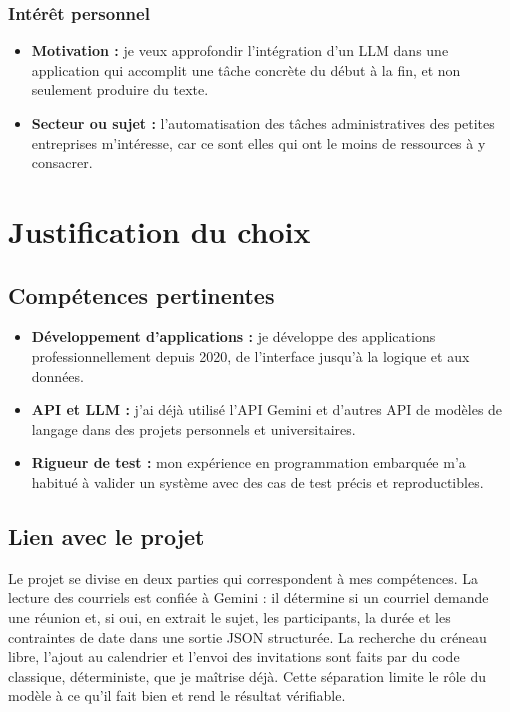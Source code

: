 \documentclass[11pt,letterpaper]{article}
\begin{document}
\subsubsection{Intérêt personnel}

\begin{itemize}
  \item \textbf{Motivation :} je veux approfondir l'intégration d'un LLM dans une application qui accomplit une tâche concrète du début à la fin, et non seulement produire du texte.
  \item \textbf{Secteur ou sujet :} l'automatisation des tâches administratives des petites entreprises m'intéresse, car ce sont elles qui ont le moins de ressources à y consacrer.
\end{itemize}

\section{Justification du choix}

\subsection{Compétences pertinentes}

\begin{itemize}
  \item \textbf{Développement d'applications :} je développe des applications professionnellement depuis 2020, de l'interface jusqu'à la logique et aux données.
  \item \textbf{API et LLM :} j'ai déjà utilisé l'API Gemini et d'autres API de modèles de langage dans des projets personnels et universitaires.
  \item \textbf{Rigueur de test :} mon expérience en programmation embarquée m'a habitué à valider un système avec des cas de test précis et reproductibles.
\end{itemize}

\subsection{Lien avec le projet}

Le projet se divise en deux parties qui correspondent à mes compétences. La lecture des courriels est confiée à Gemini : il détermine si un courriel demande une réunion et, si oui, en extrait le sujet, les participants, la durée et les contraintes de date dans une sortie JSON structurée. La recherche du créneau libre, l'ajout au calendrier et l'envoi des invitations sont faits par du code classique, déterministe, que je maîtrise déjà. Cette séparation limite le rôle du modèle à ce qu'il fait bien et rend le résultat vérifiable.
\end{document}

